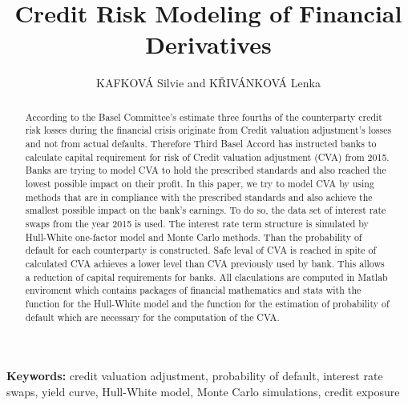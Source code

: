 \documentclass{amsart}
\theoremstyle{definition}\newtheorem{definition}[theorem]{Definition}
\theoremstyle{remark}\newtheorem{remark}[theorem]{Remark}
\begin{document}
\title{Credit Risk Modeling of Financial Derivatives}
\author{KAFKOVÁ Silvie and KŘIVÁNKOVÁ Lenka}

\begin{abstract}
According to the Basel Committee's estimate three fourths of the counterparty credit risk losses during the financial crisis originate from Credit valuation adjustment's losses and not from actual defaults. Therefore Third Basel Accord has instructed banks to calculate capital requirement for risk of Credit valuation adjustment (CVA) from 2015. Banks are trying to model CVA to hold the prescribed standards and also reached the lowest possible impact on their profit. In this paper, we try to model CVA by using methods that are in compliance with the prescribed standards and also achieve the smallest possible impact on the bank's earnings. To do so, the data set of interest rate swaps from the year 2015 is used. The interest rate term structure is simulated by Hull-White one-factor model and Monte Carlo methods. Than the probability of default for each counterparty is constructed. Safe leval of CVA is reached in spite of calculated CVA achieves a lower level than CVA previously used by bank. This allows a reduction of capital requirements for banks. All claculations are computed in Matlab enviroment which contains packages of financial mathematics and stats with the function for the Hull-White model and the function for the estimation of probability of default which are necessary for the computation of the CVA.


\end{abstract}
\maketitle

\noindent\textbf{Keywords:} credit valuation adjustment, probability of default, interest rate swaps, yield curve, Hull-White model, Monte Carlo simulations, credit exposure

\bigskip
\end{document}
